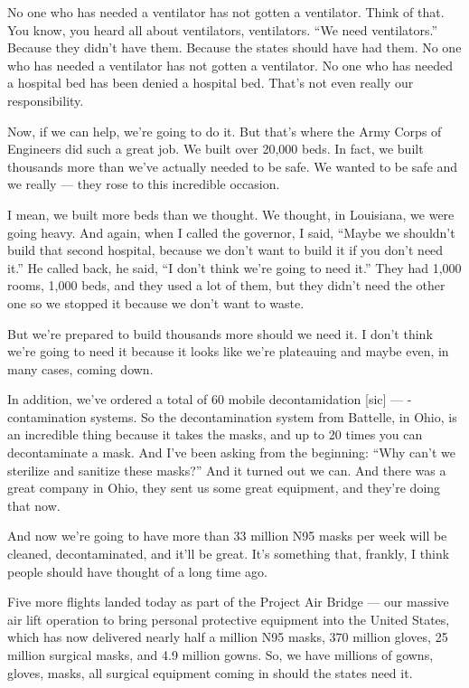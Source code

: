 No one who has needed a ventilator has not gotten a ventilator. Think of
that. You know, you heard all about ventilators, ventilators. ``We need
ventilators.'' Because they didn't have them. Because the states should
have had them. No one who has needed a ventilator has not gotten a
ventilator. No one who has needed a hospital bed has been denied a
hospital bed. That's not even really our responsibility.

Now, if we can help, we're going to do it. But that's where the Army
Corps of Engineers did such a great job. We built over 20,000 beds. In
fact, we built thousands more than we've actually needed to be safe. We
wanted to be safe and we really --- they rose to this incredible
occasion.

I mean, we built more beds than we thought. We thought, in Louisiana, we
were going heavy. And again, when I called the governor, I said, ``Maybe
we shouldn't build that second hospital, because we don't want to build
it if you don't need it.'' He called back, he said, ``I don't think
we're going to need it.'' They had 1,000 rooms, 1,000 beds, and they
used a lot of them, but they didn't need the other one so we stopped it
because we don't want to waste.

But we're prepared to build thousands more should we need it. I don't
think we're going to need it because it looks like we're plateauing and
maybe even, in many cases, coming down.

In addition, we've ordered a total of 60 mobile decontamidation
{[}sic{]} --- -contamination systems. So the decontamination system from
Battelle, in Ohio, is an incredible thing because it takes the masks,
and up to 20 times you can decontaminate a mask. And I've been asking
from the beginning: ``Why can't we sterilize and sanitize these masks?''
And it turned out we can. And there was a great company in Ohio, they
sent us some great equipment, and they're doing that now.

And now we're going to have more than 33 million N95 masks per week will
be cleaned, decontaminated, and it'll be great. It's something that,
frankly, I think people should have thought of a long time ago.

Five more flights landed today as part of the Project Air Bridge --- our
massive air lift operation to bring personal protective equipment into
the United States, which has now delivered nearly half a million N95
masks, 370 million gloves, 25 million surgical masks, and 4.9 million
gowns. So, we have millions of gowns, gloves, masks, all surgical
equipment coming in should the states need it.

